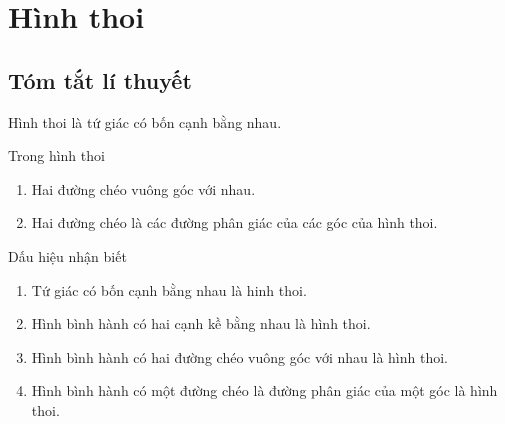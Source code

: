 \section{Hình thoi}
\subsection{Tóm tắt lí thuyết}
\begin{dn}
Hình thoi là tứ giác có bốn cạnh bằng nhau.
\end{dn}
\begin{dl}
Trong hình thoi
\begin{enumerate}
\item Hai đường chéo vuông góc với nhau.
\item Hai đường chéo là các đường phân giác của các góc của hình thoi.
\end{enumerate}
\end{dl}
\begin{hq}
Dấu hiệu nhận biết
\begin{enumerate}
\item Tứ giác có bốn cạnh bằng nhau là hinh thoi.
\item Hình bình hành có hai cạnh kề bằng nhau là hình thoi.
\item Hình bình hành có hai đường chéo vuông góc với nhau là hình thoi.
\item Hình bình hành có một đường chéo là đường phân giác của một góc là hình thoi.
\end{enumerate}
\end{hq}
